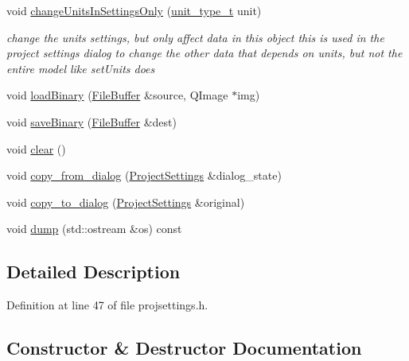 \begin{DoxyCompactItemize}
void \hyperlink{classShipCAD_1_1ProjectSettings_a08c94e7b110dd89d846e509bc44f8de9}{change\+Units\+In\+Settings\+Only} (\hyperlink{namespaceShipCAD_ac6a7a28b4b063771afae92decb602da5}{unit\+\_\+type\+\_\+t} unit)
\begin{DoxyCompactList}\small\item\em change the units settings, but only affect data in this object this is used in the project settings dialog to change the other data that depends on units, but not the entire model like set\+Units does \end{DoxyCompactList}\item 
void \hyperlink{classShipCAD_1_1ProjectSettings_af6012d62299292d0757955b14c6bd854}{load\+Binary} (\hyperlink{classShipCAD_1_1FileBuffer}{File\+Buffer} \&source, Q\+Image $\ast$img)
\item 
void \hyperlink{classShipCAD_1_1ProjectSettings_aebda4677da789819020d1ea1623ec035}{save\+Binary} (\hyperlink{classShipCAD_1_1FileBuffer}{File\+Buffer} \&dest)
\item 
void \hyperlink{classShipCAD_1_1ProjectSettings_a9e0ce44e6aea8e57608baee2a3b05827}{clear} ()
\item 
void \hyperlink{classShipCAD_1_1ProjectSettings_ab9197d79f0b8bd2657d55507a541b154}{copy\+\_\+from\+\_\+dialog} (\hyperlink{classShipCAD_1_1ProjectSettings}{Project\+Settings} \&dialog\+\_\+state)
\item 
void \hyperlink{classShipCAD_1_1ProjectSettings_a64feb4971bc82abfe783a92c15da57db}{copy\+\_\+to\+\_\+dialog} (\hyperlink{classShipCAD_1_1ProjectSettings}{Project\+Settings} \&original)
\item 
void \hyperlink{classShipCAD_1_1ProjectSettings_a9caa9e15bc03de5b6092c419a58a87e8}{dump} (std\+::ostream \&os) const 
\end{DoxyCompactItemize}


\subsection{Detailed Description}


Definition at line 47 of file projsettings.\+h.



\subsection{Constructor \& Destructor Documentation}
